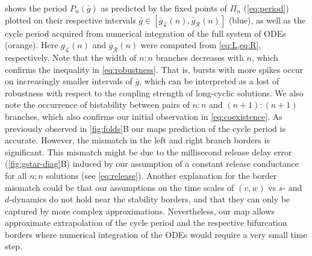  shows the period $P_{n}(\bar g)$ as predicted by the fixed points of $\Pi_{n}$ (\cref{eq:period}) plotted on their respective intervals $\bar g \in [\bar g_{\mathcal{L}}(n),\bar g_{\mathcal{R}}(n)]$ (blue), as well as the cycle period acquired from numerical integration of the full system of ODEs (orange).
Here $g_{\mathcal{L}}(n)$ and $\bar g_{\mathcal{R}}(n)$ were computed from \cref{eq:L,eq:R}, respectively.
Note that the width of $n:n$ branches decreases with $n$, which confirms the inequality in \cref{eq:robustness}.
That is, bursts with more spikes occur on increasingly smaller intervals of $\bar g$, which can be interpreted as a lost of robustness with respect to the coupling strength of long-cyclic solutions.
We also note the occurrence of bistability between pairs of $n:n$ and $(n+1):(n+1)$ branches, which also confirms our initial observation in
\cref{eq:coexistence}.
As previously observed in \cref{fig:folds}B our maps prediction of the cycle period is accurate.
However, the mismatch in the left and right branch borders is significant.
This mismatch might be due to the millisecond release delay error (\cref{fig:gstar-diag}B) induced by our assumption of a constant release conductance for all $n:n$ solutions (see \cref{eq:release}).
Another explanation for the border mismatch could be that our assumptions on the time scales of $(v,w)$ vs $s$- and $d$-dynamics do not hold near the stability borders, and that they can only be captured by more complex approximations.
Nevertheless, our map allows approximate extrapolation of the cycle period and the respective bifurcation borders where numerical integration of the ODEs would require a very small time step.
